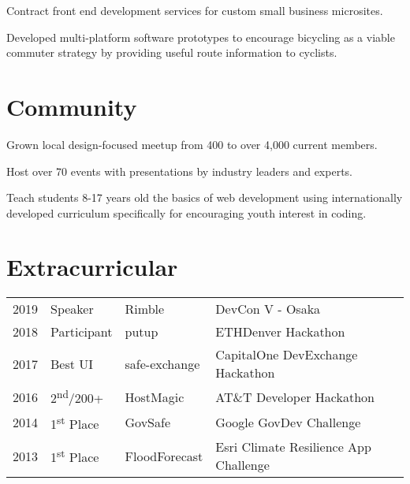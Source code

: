 \documentclass[]{deedy-resume-openfont}
\begin{document}
\begin{minipage}[t]{0.66\textwidth}
\begin{tightemize}
\item Contract front end development services for custom small business microsites. \end{tightemize}
\sectionsep

\begin{tightemize}
\item Developed multi-platform software prototypes to encourage bicycling as a viable commuter strategy by providing useful route information to cyclists. \end{tightemize}
\sectionsep


\section{Community}
\begin{tightemize}
\item Grown local design-focused meetup from 400 to over 4,000 current members.\item Host over 70 events with presentations by industry leaders  and experts.\end{tightemize}
\sectionsep

Teach students 8-17 years old the basics of web development using internationally developed curriculum specifically for encouraging youth interest in coding.
\sectionsep


\section{Extracurricular}
\begin{tabular}{rlll}
2019 & Speaker & Rimble & DevCon V - Osaka \\
2018 & Participant & putup  & ETHDenver Hackathon \\
2017 & Best UI & safe-exchange  & CapitalOne DevExchange Hackathon\\
2016 & 2\textsuperscript{nd}/200+ & HostMagic  & AT\&T Developer Hackathon \\
2014 & 1\textsuperscript{st} Place & GovSafe  & Google GovDev Challenge \\
2013 & 1\textsuperscript{st} Place & FloodForecast & Esri Climate Resilience App Challenge\\
\end{tabular}
\sectionsep

\end{minipage}
\end{document}
